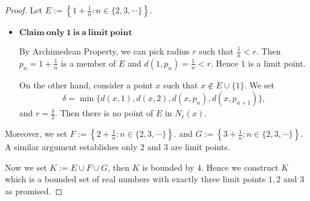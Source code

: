 \begin{Exercise}
\begin{proof}
Let $E := \left\{ 1+\frac{1}{n} : n\in \{2,3,\cdots\} \right\}$.
\begin{itemize}
\item $\mathbf{Claim\ only\ 1\ is\ a\ limit\ point}$

By Archimedean Property, we can pick radius $r$ such that $\frac{1}{n} < r$. Then $p_n = 1+\frac{1}{n}$ is a member of $E$ and $d(1, p_n) = \frac{1}{n} < r$. Hence $1$ is a limit point.

On the other hand, consider a point $x$ such that $x\notin E\cup \{1\}$. We set 
$$
\delta = \min\{d(x,1), d(x,2), d(x, p_n), d(x, p_{n+1})\},
$$
and $r = \frac{\delta}{2}$. Then there is no point of $E$ in $N_r(x)$.
\end{itemize}

Moreover, we set $F := \left\{ 2+\frac{1}{n} : n\in \{2,3,\cdots\} \right\}$. and $G := \left\{ 3+\frac{1}{n} : n\in \{2,3,\cdots\} \right\}$. A similar argument establishes only $2$ and $3$ are limit points.

Now we set $K := E\cup F\cup G$, then $K$ is bounded by $4$. Hence we construct $K$ which is a bounded set of real numbers with exactly three limit points $1,2$ and $3$ as promised.
\end{proof}
\end{Exercise}